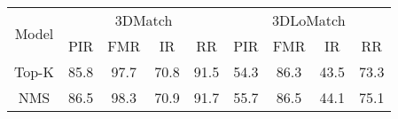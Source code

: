 \begin{table}[htp]
	\renewcommand{\arraystretch}{1}
    \centering
    \label{tab:ablation_anchor_way}
    \wuhao
    \begin{tabular}{ccccccccc}
    \toprule[1.5pt]
    \multirow{2}{*}{Model} & \multicolumn{4}{c}{3DMatch}  & \multicolumn{4}{c}{3DLoMatch} \\
    &{PIR} &{FMR} &{IR} &{RR}
    &{PIR} &{FMR} &{IR} &{RR}    \\ \hline
    {Top-K} & 85.8 & 97.7 & 70.8 & 91.5 & 54.3 & 86.3 & 43.5 & 73.3 \\
    {NMS}     & 86.5 & 98.3 & 70.9 & 91.7 & 55.7 & 86.5 & 44.1 & 75.1 \\ \bottomrule[1.5pt]
    \end{tabular}
\end{table}